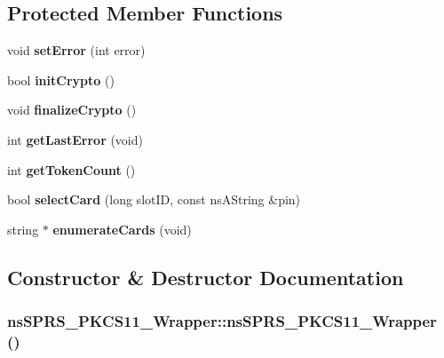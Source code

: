 \subsection*{Protected Member Functions}
\begin{DoxyCompactItemize}
\item 
\hypertarget{classnsSPRS__PKCS11__Wrapper_a9fb490e90a235df6b273c06ba284076e}{
void {\bfseries setError} (int error)}
\label{classnsSPRS__PKCS11__Wrapper_a9fb490e90a235df6b273c06ba284076e}

\item 
\hypertarget{classnsSPRS__PKCS11__Wrapper_a603124bb2ec2f4b6abac9c077664cda7}{
bool {\bfseries initCrypto} ()}
\label{classnsSPRS__PKCS11__Wrapper_a603124bb2ec2f4b6abac9c077664cda7}

\item 
\hypertarget{classnsSPRS__PKCS11__Wrapper_aa11b58c73c6846a2f15365880703150a}{
void {\bfseries finalizeCrypto} ()}
\label{classnsSPRS__PKCS11__Wrapper_aa11b58c73c6846a2f15365880703150a}

\item 
\hypertarget{classnsSPRS__PKCS11__Wrapper_a409dd546aad42560ed8e537dc2d61abc}{
int {\bfseries getLastError} (void)}
\label{classnsSPRS__PKCS11__Wrapper_a409dd546aad42560ed8e537dc2d61abc}

\item 
\hypertarget{classnsSPRS__PKCS11__Wrapper_ae95c96664a1d6cd17a9ed5869448be0e}{
int {\bfseries getTokenCount} ()}
\label{classnsSPRS__PKCS11__Wrapper_ae95c96664a1d6cd17a9ed5869448be0e}

\item 
\hypertarget{classnsSPRS__PKCS11__Wrapper_aca888cd1ea10ac257332bd089db5888a}{
bool {\bfseries selectCard} (long slotID, const nsAString \&pin)}
\label{classnsSPRS__PKCS11__Wrapper_aca888cd1ea10ac257332bd089db5888a}

\item 
\hypertarget{classnsSPRS__PKCS11__Wrapper_aacf5801892adb8eb441e6a5c3900b906}{
string $\ast$ {\bfseries enumerateCards} (void)}
\label{classnsSPRS__PKCS11__Wrapper_aacf5801892adb8eb441e6a5c3900b906}

\end{DoxyCompactItemize}


\subsection{Constructor \& Destructor Documentation}
\hypertarget{classnsSPRS__PKCS11__Wrapper_aae53c562eb02e180de0efd9e38a8a13a}{
\subsubsection[{nsSPRS\_\-PKCS11\_\-Wrapper}]{\setlength{\rightskip}{0pt plus 5cm}nsSPRS\_\-PKCS11\_\-Wrapper::nsSPRS\_\-PKCS11\_\-Wrapper ()}}
\label{classnsSPRS__PKCS11__Wrapper_aae53c562eb02e180de0efd9e38a8a13a}


